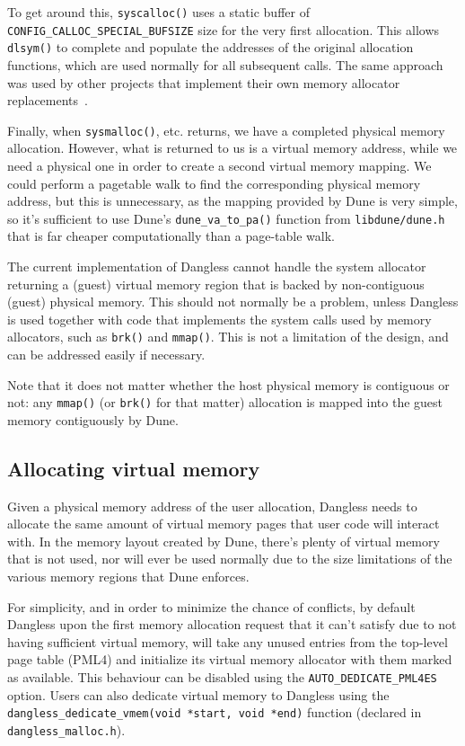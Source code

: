 To get around this, \lstinline!syscalloc()! uses a static buffer of \lstinline!CONFIG_CALLOC_SPECIAL_BUFSIZE! size for the very first allocation. This allows \lstinline!dlsym()! to complete and populate the addresses of the original allocation functions, which are used normally for all subsequent calls. The same approach was used by other projects that implement their own memory allocator replacements~\cite{dlsym-calloc-special-ex1}.

Finally, when \lstinline!sysmalloc()!, etc. returns, we have a completed physical memory allocation. However, what is returned to us is a virtual memory address, while we need a physical one in order to create a second virtual memory mapping. We could perform a pagetable walk to find the corresponding physical memory address, but this is unnecessary, as the mapping provided by Dune is very simple, so it's sufficient to use Dune's \lstinline!dune_va_to_pa()! function from \texttt{libdune/dune.h} that is far cheaper computationally than a page-table walk.

The current implementation of Dangless cannot handle the system allocator returning a (guest) virtual memory region that is backed by non-contiguous (guest) physical memory. This should not normally be a problem, unless Dangless is used together with code that implements the system calls used by memory allocators, such as \lstinline!brk()! and \lstinline!mmap()!. This is not a limitation of the design, and can be addressed easily if necessary.

Note that it does not matter whether the host physical memory is contiguous or not: any \lstinline!mmap()! (or \lstinline!brk()! for that matter) allocation is mapped into the guest memory contiguously by Dune.

\subsection{Allocating virtual memory}
\label{sec:dangless-alloc-virtmem}

Given a physical memory address of the user allocation, Dangless needs to allocate the same amount of virtual memory pages that user code will interact with. In the memory layout created by Dune, there's plenty of virtual memory that is not used, nor will ever be used normally due to the size limitations of the various memory regions that Dune enforces.

For simplicity, and in order to minimize the chance of conflicts, by default Dangless upon the first memory allocation request that it can't satisfy due to not having sufficient virtual memory, will take any unused entries from the top-level page table (PML4)  and initialize its virtual memory allocator with them marked as available. This behaviour can be disabled using the \lstinline!AUTO_DEDICATE_PML4ES! option. Users can also dedicate virtual memory to Dangless using the \lstinline!dangless_dedicate_vmem(void *start, void *end)! function (declared in \texttt{dangless\_malloc.h}).

